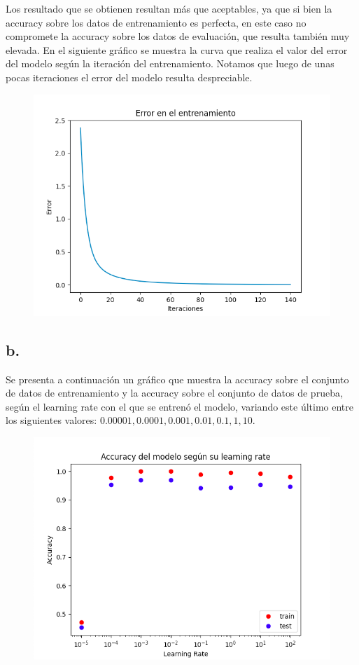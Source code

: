 \documentclass{article}
\begin{document}
Los resultado que se obtienen resultan más que aceptables, ya que si bien la accuracy sobre los datos de entrenamiento es perfecta, en este caso no compromete la accuracy sobre los datos de evaluación, que resulta también muy elevada. 
En el siguiente gráfico se muestra la curva que realiza el valor del error del modelo según la iteración del entrenamiento. Notamos que luego de unas pocas iteraciones el error del modelo resulta despreciable.

\begin{figure}[H]
	\centering
	\includegraphics*[scale=0.4]{Images/grafica1_redes.png}
\end{figure}

\subsection*{b.}

Se presenta a continuación un gráfico que muestra la accuracy sobre el conjunto de datos de entrenamiento y la accuracy sobre el conjunto de datos de prueba, según el learning rate con el que se entrenó el modelo, variando este último entre los siguientes valores: $0.00001, 0.0001, 0.001, 0.01, 0.1, 1, 10$.

\begin{figure}[H]
	\centering
	\includegraphics*[scale=0.4]{Images/grafica2_redes.png}
\end{figure}
\end{document}
